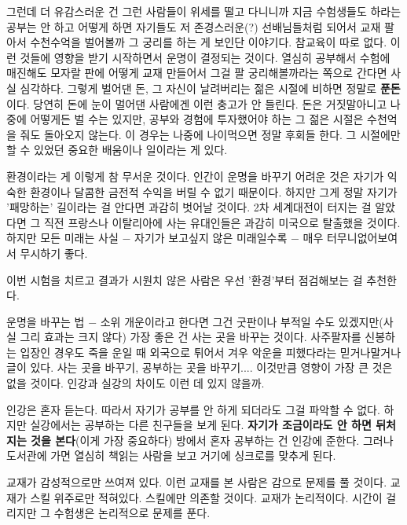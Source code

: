 그런데 더 유감스러운 건 그런 사람들이 위세를 떨고 다니니까 지금 수험생들도 하라는 공부는 안 하고
어떻게 하면 자기들도 저 존경스러운(?) 선배님들처럼 되어서 교재 팔아서 수천수억을 벌어볼까 그 궁리를 하는 게 보인단 이야기다.
참교육이 따로 없다. 이런 것들에 영향을 받기 시작하면서 운명이 결정되는 것이다.
열심히 공부해서 수험에 매진해도 모자랄 판에 어떻게 교재 만들어서 그걸 팔 궁리해볼까라는 쪽으로 간다면 사실 심각하다.
그렇게 벌어댄 돈, 그 자신이 날려버리는 젊은 시절에 비하면 정말로 \textbf{푼돈}이다. 당연히 돈에 눈이 멀어댄 사람에겐 이런 충고가 안 들린다.
돈은 거짓말아니고 나중에 어떻게든 벌 수는 있지만, 공부와 경험에 투자했어야 하는 그 젊은 시절은 수천억을 줘도 돌아오지 않는다.
이 경우는 나중에 나이먹으면 정말 후회들 한다. 그 시절에만 할 수 있었던 중요한 배움이나 일이라는 게 있다.
\vspace{5mm}

환경이라는 게 이렇게 참 무서운 것이다.
인간이 운명을 바꾸기 어려운 것은 자기가 익숙한 환경이나 달콤한 금전적 수익을 버릴 수 없기 때문이다.
하지만 그게 정말 자기가 '패망하는' 길이라는 걸 안다면 과감히 벗어날 것이다.
2차 세계대전이 터지는 걸 알았다면 그 직전 프랑스나 이탈리아에 사는 유대인들은 과감히 미국으로 탈출했을 것이다.
하지만 모든 미래는 사실 $-$ 자기가 보고싶지 않은 미래일수록 $-$ 매우 터무니없어보여서 무시하기 좋다.
\vspace{5mm}

이번 시험을 치르고 결과가 시원치 않은 사람은 우선 '환경'부터 점검해보는 걸 추천한다.
\vspace{5mm}

운명을 바꾸는 법 $-$ 소위 개운이라고 한다면 그건 굿판이나 부적일 수도 있겠지만(사실 그리 효과는 크지 않다)
가장 좋은 건 사는 곳을 바꾸는 것이다.
사주팔자를 신봉하는 입장인 경우도 죽을 운일 때 외국으로 튀어서 겨우 악운을 피했다라는 믿거나말거나 글이 있다.
사는 곳을 바꾸기, 공부하는 곳을 바꾸기.... 이것만큼 영향이 가장 큰 것은 없을 것이다.
인강과 실강의 차이도 이런 데 있지 않을까.
\vspace{5mm}

인강은 혼자 듣는다. 따라서 자기가 공부를 안 하게 되더라도 그걸 파악할 수 없다.
하지만 실강에서는 공부하는 다른 친구들을 보게 된다. \textbf{자기가 조금이라도 안 하면 뒤처지는 것을 본다}(이게 가장 중요하다)
방에서 혼자 공부하는 건 인강에 준한다. 그러나 도서관에 가면 열심히 책읽는 사람을 보고 거기에 싱크로를 맞추게 된다.
\vspace{5mm}

교재가 감성적으로만 쓰여져 있다. 이런 교재를 본 사람은 감으로 문제를 풀 것이다.
교재가 스킬 위주로만 적혀있다. 스킬에만 의존할 것이다.
교재가 논리적이다. 시간이 걸리지만 그 수험생은 논리적으로 문제를 푼다.
\vspace{5mm}

